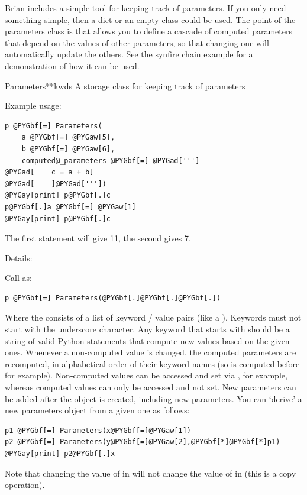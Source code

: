 \documentclass[letterpaper,10pt,english]{manual}
\begin{document}
Brian includes a simple tool for keeping track of parameters. If you only need
something simple, then a dict or an empty class could be used. The point of the
parameters class is that allows you to define a cascade of computed parameters
that depend on the values of other parameters, so that changing one will
automatically update the others. See the synfire chain example
 for a demonstration of how it can be used.

\hypertarget{brian.Parameters}{}\begin{classdesc}{Parameters}{**kwds}
A storage class for keeping track of parameters

Example usage:

\begin{Verbatim}[commandchars=@\[\]]
p @PYGbf[=] Parameters(
    a @PYGbf[=] @PYGaw[5],
    b @PYGbf[=] @PYGaw[6],
    computed@_parameters @PYGbf[=] @PYGad[''']
@PYGad[    c = a + b]
@PYGad[    ]@PYGad['''])
@PYGay[print] p@PYGbf[.]c
p@PYGbf[.]a @PYGbf[=] @PYGaw[1]
@PYGay[print] p@PYGbf[.]c
\end{Verbatim}

The first  statement will give 11, the second gives 7.

Details:

Call as:

\begin{Verbatim}[commandchars=@\[\]]
p @PYGbf[=] Parameters(@PYGbf[.]@PYGbf[.]@PYGbf[.])
\end{Verbatim}

Where the  consists of a list of keyword / value pairs (like a ).
Keywords must not start with the underscore \code{\_} character. Any
keyword that starts with  should be a string of valid Python statements
that compute new values based on the given ones. Whenever a non-computed value is
changed, the computed parameters are recomputed, in alphabetical order of their
keyword names (so  is computed before  for example).
Non-computed values can be accessed and set via ,  for example, whereas
computed values can only be accessed and not set. New parameters can be added
after the \hyperlink{brian.Parameters}{} object is created, including new  parameters. You
can `derive' a new parameters object from a given one as follows:

\begin{Verbatim}[commandchars=@\[\]]
p1 @PYGbf[=] Parameters(x@PYGbf[=]@PYGaw[1])
p2 @PYGbf[=] Parameters(y@PYGbf[=]@PYGaw[2],@PYGbf[*]@PYGbf[*]p1)
@PYGay[print] p2@PYGbf[.]x
\end{Verbatim}

Note that changing the value of  in  will not change the value of  in  (this
is a copy operation).
\end{classdesc}
\end{document}
